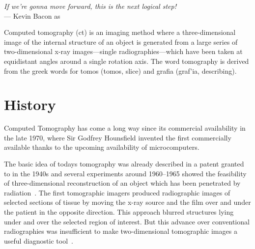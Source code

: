 \label{ch:ct}
\begin{flushright}{\slshape If we're gonna move forward, this is the next logical step!} \\ \medskip
    --- Kevin Bacon as \citep{HollowMan}
\end{flushright}
\bigskip
\bigskip
Computed tomography (\acs{ct}) is an imaging method where a three-dimensional image of the internal structure of an object is generated from a large series of two-dimensional x-ray images---single radiographies---which have been taken at equidistant angles
around a single rotation axis. The word tomography is derived from the greek words for tomos (\greektext tomos\latintext, slice) and grafia (\greektext graf'ia\latintext, describing).

\section{History}
Computed Tomography has come a long way since its commercial availability in the late 1970, where Sir Godfrey Hounsfield invented the first commercially available thanks to the upcoming availability of microcomputers.

The basic idea of todays tomography was already described in a patent granted to \citet{Frank1942} in the 1940s and several experiments around 1960--1965 showed the feasibility of three-dimensional reconstruction of an object which has been penetrated by radiation~\cite{Hsieh2003}. The first tomographic imagers produced radiographic images of selected sections of tissue by moving the x-ray source and the film over and under the patient in the opposite direction. This approach blurred structures lying under and over the selected region of interest. But this advance over conventional radiographies was insufficient to make two-dimensional tomographic images a useful diagnostic tool~\cite{Robb2003}.

